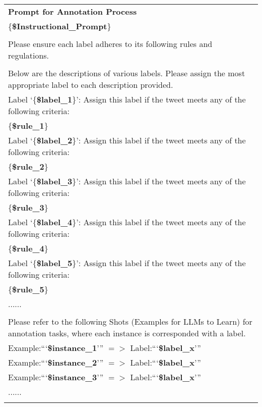 \begin{table*}[h]
\centering
    \begin{tabular}{@{}p{\textwidth}@{}}
        \hline
        \textbf{Prompt for Annotation Process} \\
        \{\textbf{\$Instructional\_Prompt}\}\\ \\
        Please ensure each label adheres to its following rules and regulations.\\
        \\
        Below are the descriptions of various labels. Please assign the most appropriate label to each description provided.\\
        Label `\{\textbf{\$label\_1}\}': Assign this label if the tweet meets any of the following criteria:\\
        \{\textbf{\$rule\_1}\}\\ 
        Label `\{\textbf{\$label\_2}\}': Assign this label if the tweet meets any of the following criteria:\\
        \{\textbf{\$rule\_2}\}\\ 
        Label `\{\textbf{\$label\_3}\}': Assign this label if the tweet meets any of the following criteria:\\
        \{\textbf{\$rule\_3}\}\\ 
        Label `\{\textbf{\$label\_4}\}': Assign this label if the tweet meets any of the following criteria:\\
        \{\textbf{\$rule\_4}\}\\
        Label `\{\textbf{\$label\_5}\}': Assign this label if the tweet meets any of the following criteria:\\
        \{\textbf{\$rule\_5}\}\\
        ......\\ \\
        Please refer to the following Shots (Examples for LLMs to Learn) for annotation tasks, where each instance is corresponded with a label.\\
        Example:```{\textbf{\$instance\_1}}''' $=>$ Label:```{\textbf{\$label\_x}}'''\\
        Example:```{\textbf{\$instance\_2}}''' $=>$ Label:```{\textbf{\$label\_x}}'''\\
        Example:```{\textbf{\$instance\_3}}''' $=>$ Label:```{\textbf{\$label\_x}}'''\\
        ......\\ \\

\end{tabular}
\end{table*}
